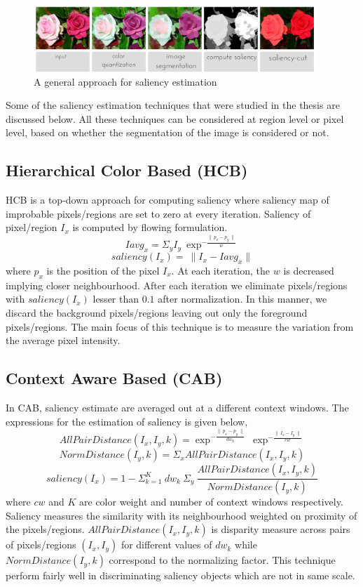 \begin{figure}[htpb]
   \begin{center}
	    \includegraphics[width=0.95\textwidth]{snaps/sal/saliency.eps}     
     \caption {A general approach for saliency estimation}
   \label{fig:salap}
   \end{center}
 \end{figure}

\par Some of the saliency estimation techniques that were studied in the thesis are discussed below. All these techniques can be considered at region level or pixel level, based on whether the segmentation of the image is considered or not.

\subsection{Hierarchical Color Based (HCB)}
HCB is a top-down approach for computing saliency where saliency map of improbable pixels/regions are set to zero at every iteration. Saliency of pixel/region $I_{x}$ is computed by flowing formulation. 
$$ Iavg_{x} = \Sigma_{y} I_{y}~\exp^{-\frac{\parallel~p_{x} - p_{y}~\parallel}{w}}  $$
$$ saliency(I_{x}) =~\parallel I_{x} - Iavg_{x} \parallel $$
where $p_{x}$ is the position of the pixel $I_{x}$. At each iteration, the $w$ is decreased implying closer neighbourhood. After each iteration we eliminate pixels/regions with $ saliency(I_{x})$ lesser than $0.1$ after normalization. In this manner, we  discard the background pixels/regions leaving out only the foreground pixels/regions. The main focus of this technique is to measure the variation from the average pixel intensity.

\subsection{Context Aware Based (CAB)}
In CAB, saliency estimate are averaged out at a different context windows. The expressions for the estimation of saliency is given below,
$$ AllPairDistance(I_{x},I_{y},k) = \exp^{-\frac{\parallel~p_x - p_y~\parallel}{dw_k}}~\exp^{-\frac{\parallel~I_{x} - I_{y}~\parallel}{cw}}$$
$$ NormDistance(I_{y},k) = \Sigma_{x} AllPairDistance(I_{x},I_{y},k)$$
$$ saliency(I_{x}) = 1- \Sigma^{K}_{k=1}~dw_{k}~\Sigma_{y}~\frac{AllPairDistance(I_{x},I_{y},k)}{NormDistance(I_{y},k)}$$
where $cw$ and $K$ are color weight and number of context windows respectively. Saliency measures the similarity with its neighbourhood weighted on proximity of the pixels/regions. $AllPairDistance(I_{x},I_{y},k)$ is disparity measure across pairs of pixels/regions $(I_{x},I_{y})$ for different values of $dw_{k}$ while $NormDistance(I_{y},k)$ correspond to the normalizing factor.
This technique perform fairly well in discriminating saliency objects which are not in same scale.

